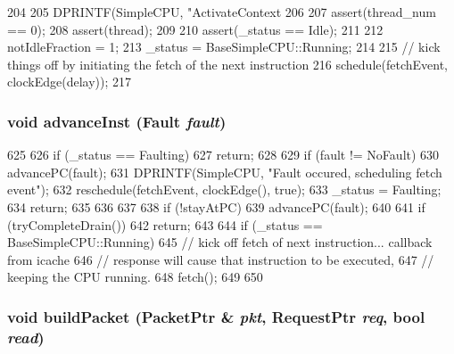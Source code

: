 \begin{DoxyCode}
204 {
205     DPRINTF(SimpleCPU, "ActivateContext %
206 
207     assert(thread_num == 0);
208     assert(thread);
209 
210     assert(_status == Idle);
211 
212     notIdleFraction = 1;
213     _status = BaseSimpleCPU::Running;
214 
215     // kick things off by initiating the fetch of the next instruction
216     schedule(fetchEvent, clockEdge(delay));
217 }
\end{DoxyCode}
\hypertarget{classTimingSimpleCPU_ab1a431d7af8dd2bbc95d09bd71be13ca}{
\subsubsection[{advanceInst}]{\setlength{\rightskip}{0pt plus 5cm}void advanceInst ({\bf Fault} {\em fault})}}
\label{classTimingSimpleCPU_ab1a431d7af8dd2bbc95d09bd71be13ca}



\begin{DoxyCode}
625 {
626     if (_status == Faulting)
627         return;
628 
629     if (fault != NoFault) {
630         advancePC(fault);
631         DPRINTF(SimpleCPU, "Fault occured, scheduling fetch event\n");
632         reschedule(fetchEvent, clockEdge(), true);
633         _status = Faulting;
634         return;
635     }
636 
637 
638     if (!stayAtPC)
639         advancePC(fault);
640 
641     if (tryCompleteDrain())
642             return;
643 
644     if (_status == BaseSimpleCPU::Running) {
645         // kick off fetch of next instruction... callback from icache
646         // response will cause that instruction to be executed,
647         // keeping the CPU running.
648         fetch();
649     }
650 }
\end{DoxyCode}
\hypertarget{classTimingSimpleCPU_aefe7c644107e54e9aa677838cd1a947f}{
\subsubsection[{buildPacket}]{\setlength{\rightskip}{0pt plus 5cm}void buildPacket ({\bf PacketPtr} \& {\em pkt}, \/  {\bf RequestPtr} {\em req}, \/  bool {\em read})}}
\label{classTimingSimpleCPU_aefe7c644107e54e9aa677838cd1a947f}



